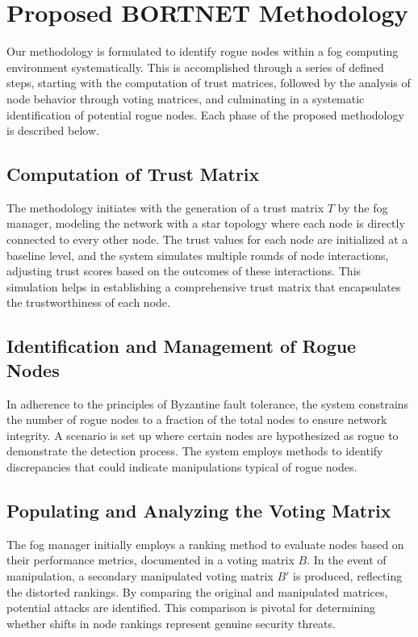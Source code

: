 \documentclass{sn-jnl}%
\begin{document}
\section{Proposed BORTNET Methodology}
Our methodology is formulated to identify rogue nodes within a fog computing environment systematically. This is accomplished through a series of defined steps, starting with the computation of trust matrices, followed by the analysis of node behavior through voting matrices, and culminating in a systematic identification of potential rogue nodes. Each phase of the proposed methodology is described below.

\subsection{Computation of Trust Matrix}

The methodology initiates with the generation of a trust matrix $T$ by the fog manager, modeling the network with a star topology where each node is directly connected to every other node. The trust values for each node are initialized at a baseline level, and the system simulates multiple rounds of node interactions, adjusting trust scores based on the outcomes of these interactions. This simulation helps in establishing a comprehensive trust matrix that encapsulates the trustworthiness of each node.



\subsection{Identification and Management of Rogue Nodes}

In adherence to the principles of Byzantine fault tolerance, the system constrains the number of rogue nodes to a fraction of the total nodes to ensure network integrity. A scenario is set up where certain nodes are hypothesized as rogue to demonstrate the detection process. The system employs methods to identify discrepancies that could indicate manipulations typical of rogue nodes.

\subsection{Populating and Analyzing the Voting Matrix}

The fog manager initially employs a ranking method to evaluate nodes based on their performance metrics, documented in a voting matrix $B$. In the event of manipulation, a secondary manipulated voting matrix $B'$ is produced, reflecting the distorted rankings. By comparing the original and manipulated matrices, potential attacks are identified. This comparison is pivotal for determining whether shifts in node rankings represent genuine security threats.
\end{document}
